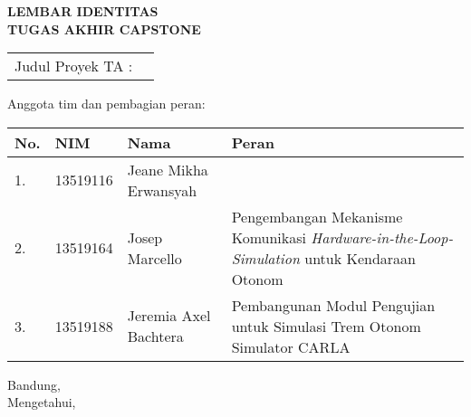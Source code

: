 \clearpage
\pagestyle{empty}

\begin{center}
	\smallskip

	\Large \bfseries \MakeUppercase{
		Lembar Identitas \\
		Tugas Akhir Capstone
	}
	\vspace{0.5cm}

	\raggedright
	\begin{table}[h!]
		\large \bfseries
		\begin{onehalfspace}
		\begin{tabular}{p{} p{}}
			Judul Proyek TA : & \capstonetitle \\
		\end{tabular}
		\end{onehalfspace}
	\end{table}

	\normalsize \normalfont

	Anggota tim dan pembagian peran:

	\begin{table}[h!]
		\begin{onehalfspace}
		\begingroup
		\def\arraystretch{1.25}
		\begin{tabular}{|p{} | p{} | p{} | p{0.50\textwidth}|}
			\hline
			\textbf{No.} & \textbf{NIM} & \textbf{Nama}         & \textbf{Peran} \\
			\hline
			1.           & 13519116     & Jeane Mikha Erwansyah & \thetitle \\
			\hline
			2.           & 13519164     & Josep Marcello        & Pengembangan Mekanisme Komunikasi \textit{Hardware-in-the-Loop-Simulation} untuk Kendaraan Otonom \\
			\hline
			3.           & 13519188     & Jeremia Axel Bachtera & Pembangunan Modul Pengujian untuk Simulasi Trem Otonom Simulator CARLA \\
			\hline
		\end{tabular}
		\endgroup
		\end{onehalfspace}
	\end{table}

	\vfill
	\begin{center}
		\normalsize \normalfont
		Bandung, \thedate \\
		Mengetahui,
	\end{center}
	\advisorapproval

\end{center}
\clearpage
